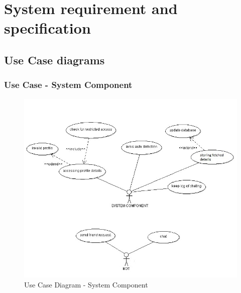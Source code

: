 \chapter{System requirement and specification}


\section{Use Case diagrams}
\subsection{Use Case - System Component}


\begin{figure}[H]
\centering
\includegraphics[scale=0.7]{project/diagrams/usecase1}
\caption{Use Case Diagram - System Component}
\label{fig:usecase1}
\end{figure}

